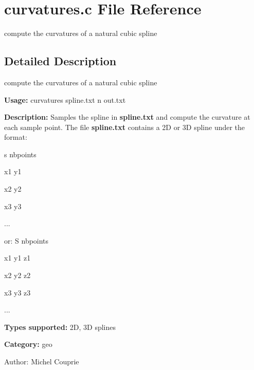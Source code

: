 \section{curvatures.c File Reference}
\label{curvatures_8c}
compute the curvatures of a natural cubic spline 



\subsection{Detailed Description}
compute the curvatures of a natural cubic spline 

{\bf Usage:} curvatures spline.txt n out.txt

{\bf Description:} Samples the spline in {\bf spline.txt} and compute the curvature at each sample point. The file {\bf spline.txt} contains a 2D or 3D spline under the format:\par
 s nbpoints\par
 x1 y1\par
 x2 y2\par
 x3 y3\par
 ...\par
 or: S nbpoints\par
 x1 y1 z1\par
 x2 y2 z2\par
 x3 y3 z3\par
 ...\par


{\bf Types supported:} 2D, 3D splines

{\bf Category:} geo

\begin{Desc}
\item[Author:]Michel Couprie \end{Desc}
